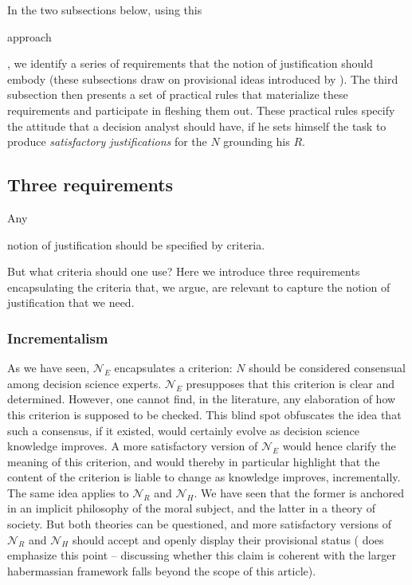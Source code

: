 \documentclass[preprint, french, english, 11pt, authoryear]{elsarticle}%
\begin{document}
In the two subsections below, using this \begin{changebar}approach\end{changebar}, we identify a series of requirements that the notion of justification should embody (these subsections draw on provisional ideas introduced by \citet{meinard_du_2013, meinard_what_2017}). 
The third subsection then presents a set of practical rules that materialize these requirements and participate in fleshing them out. These practical rules specify the attitude that a decision analyst should have, if he sets himself the task to produce \emph{satisfactory justifications} for the $N$ grounding his $R$.

\subsection{Three requirements}
Any \begin{changebar}notion of justification should be specified by criteria.\end{changebar} But what criteria should one use? Here we introduce three requirements encapsulating the criteria that, we argue, are relevant to capture the notion of justification that we need.

\subsubsection{Incrementalism}
As we have seen, $\mathscr{N}_E$ encapsulates a criterion: $N$ should be considered consensual among decision science experts. $\mathscr{N}_E$ presupposes that this criterion is clear and determined. However, one cannot find, in the literature, any elaboration of how this criterion is supposed to be checked. 
This blind spot obfuscates the idea that such a consensus, if it existed, would certainly evolve as decision science knowledge improves. 
A more satisfactory version of $\mathscr{N}_E$ would hence clarify the meaning of this criterion, and would thereby in particular highlight that the content of the criterion is liable to change as knowledge improves, incrementally. The same idea applies to $\mathscr{N}_{R}$ and $\mathscr{N}_{H}$. 
We have seen that the former is anchored in an implicit philosophy of the moral subject, and the latter in a theory of society. 
But both theories can be questioned, and more satisfactory versions of $\mathscr{N}_{R}$ and $\mathscr{N}_{H}$ should accept and openly display their provisional status 
(\cite{habermas_moralbewustsein_1983} does emphasize this point -- discussing whether this claim is coherent with the larger habermassian framework falls beyond the scope of this article).
\end{document}
